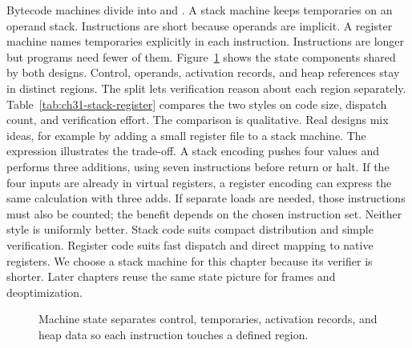 Bytecode machines divide into  and .
A stack machine keeps temporaries on an operand stack.
Instructions are short because operands are implicit.
A register machine names temporaries explicitly in each instruction.
Instructions are longer but programs need fewer of them.
Figure~\ref{fig:ch31-machine-state} shows the state components shared by both designs.
Control, operands, activation records, and heap references stay in distinct regions.
The split lets verification reason about each region separately.
Table~\ref{tab:ch31-stack-register} compares the two styles on code size, dispatch count, and verification effort.
The comparison is qualitative.
Real designs mix ideas, for example by adding a small register file to a stack machine.
The expression  illustrates the trade-off.
A stack encoding pushes four values and performs three additions, using seven instructions before return or halt.
If the four inputs are already in virtual registers, a register encoding can express the same calculation with three adds.
If separate loads are needed, those instructions must also be counted; the benefit depends on the chosen instruction set.
Neither style is uniformly better.
Stack code suits compact distribution and simple verification.
Register code suits fast dispatch and direct mapping to native registers.
We choose a stack machine for this chapter because its verifier is shorter.
Later chapters reuse the same state picture for frames and deoptimization.

\begin{figure}[htbp]
\centering
{}
\caption{Machine state separates control, temporaries, activation records, and heap data so each instruction touches a defined region.}
\label{fig:ch31-machine-state}
\end{figure}

